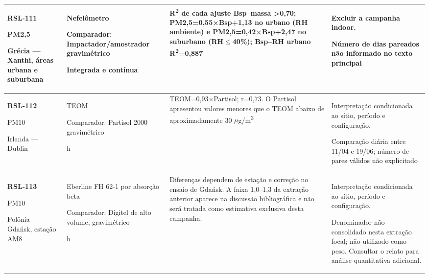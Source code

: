 \begin{longtable}{|P{0.18\textwidth}|P{0.25\textwidth}|P{0.28\textwidth}|P{\arrayrulewidth\relax}|}
\textbf{RSL-111}\par\textcite{rsl111}\par PM2,5\par Grécia --- Xanthi, áreas urbana e suburbana & Nefelômetro\par\medskip Comparador: Impactador/amostrador gravimétrico\par\medskip Integrada e contínua & R\textsuperscript{2} de cada ajuste Bsp--massa >0,70; PM2,5=0,55×Bsp+1,13 no urbano (RH ambiente) e PM2,5=0,42×Bsp+2,47 no suburbano (RH\ensuremath{\leq}40\%); Bsp--RH urbano R\textsuperscript{2}=0,887 & Excluir a campanha indoor.\par\medskip Número de dias pareados não informado no texto principal\\\hline
\textbf{RSL-112}\par\textcite{rsl112}\par PM10\par Irlanda --- Dublin & TEOM\par\medskip Comparador: Partisol 2000 gravimétrico\par{} h & TEOM=0,93×Partisol; r=0,73. O Partisol apresentou valores menores que o TEOM abaixo de aproximadamente 30 \ensuremath{\mu}g/m\textsuperscript{3} & Interpretação condicionada ao sítio, período e configuração.\par\medskip Comparação diária entre 11/04 e 19/06; número de pares válidos não explicitado\\\hline
\textbf{RSL-113}\par\textcite{rsl113}\par PM10\par Polônia --- Gdańsk, estação AM8 & Eberline FH 62-1 por absorção beta\par\medskip Comparador: Digitel de alto volume, gravimétrico\par{} h & Diferenças dependem de estação e correção no ensaio de Gdańsk. A faixa 1,0--1,3 da extração anterior aparece na discussão bibliográfica e não será tratada como estimativa exclusiva desta campanha. & Interpretação condicionada ao sítio, período e configuração.\par\medskip Denominador não consolidado nesta extração focal; não utilizado como peso. Consultar o relato para análise quantitativa adicional.\\\hline

\end{longtable}
